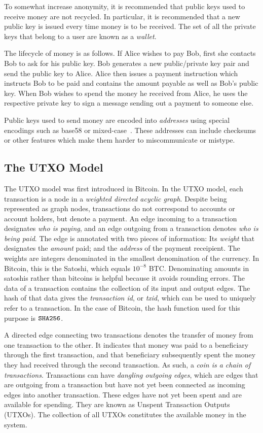 To somewhat increase anonymity, it is recommended that public keys used to
receive money are not recycled. In particular, it is recommended that a new
public key is issued every time money is to be received. The set of all
the private keys that belong to a user are known as a
\emph{wallet}.

The lifecycle of money is as follows. If Alice wishes to pay Bob, first she
contacts Bob to ask for his public key. Bob generates a new public/private key
pair and send the public key to Alice. Alice then issues a payment instruction
which instructs Bob to be paid and contains the amount payable as well as Bob's
public key. When Bob wishes to spend the money he received from Alice, he uses
the respective private key to sign a message sending out a payment to someone
else.

Public keys used to send money are encoded into \emph{addresses}
using special encodings such as base58 or mixed-case~\cite{eip55}.
These addresses can include checksums or other features which make them harder
to miscommunicate or mistype.

\subsection{The UTXO Model}

The UTXO model was first introduced in Bitcoin. In the UTXO model, each
transaction is a node in a \emph{weighted directed acyclic graph}. Despite being
represented as graph nodes, transactions do not correspond to accounts or
account holders, but denote a payment. An edge incoming to a transaction
designates \emph{who is paying}, and an edge outgoing from a transaction denotes
\emph{who is being paid}. The edge is annotated with two pieces of information:
Its \emph{weight} that designates the \emph{amount} paid; and the \emph{address}
of the payment receipient. The weights are integers denominated in the smallest
denomination of the currency. In Bitcoin, this is the Satoshi,
which equals $10^{-8}$ BTC. Denominating amounts in satoshis rather than
bitcoins is helpful because it avoids rounding errors. The data of a transaction
contains the collection of its input and output edges. The hash of that data
gives the \emph{transaction id}, or \emph{txid}, which can be used
to uniquely refer to a transaction. In the case of Bitcoin, the hash function
used for this purpose is $\mathtt{SHA256}$.

A directed edge connecting two transactions denotes the transfer of money
from one transaction to the other. It indicates that money was paid to a
beneficiary through the first transaction, and that beneficiary subsequently
spent the money they had received through the second transaction. As such,
a \emph{coin is a chain of transactions}. Transactions can have \emph{dangling
outgoing edges}, which are edges that are outgoing from a transaction but have
not yet been connected as incoming edges into another transaction. These edges
have not yet been spent and are available for spending. They are known as
Unspent Transaction Outputs (UTXOs). The collection of all UTXOs
constitutes the available money in the system.

